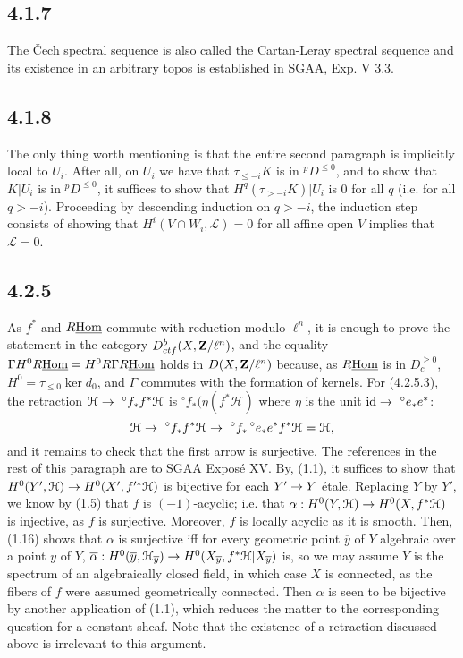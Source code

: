 \documentclass[deligne.tex]{subfiles}
\begin{document}
\subsection*{4.1.7}
The \v Cech spectral sequence is also called the Cartan-Leray spectral
sequence and its existence in an arbitrary topos is established in
SGAA, Exp. V 3.3.

\subsection*{4.1.8} The only thing worth mentioning is that the entire
second paragraph is implicitly local to $U_i$. After all, on $U_i$ we have 
that $\tau_{\leq-i}K$ is in $^pD^{\leq0}$, and to show that $K|{U_i}$ is in
$^pD^{\leq0}$, it suffices to show that $H^q(\tau_{>-i}K)|{U_i}$ is 0 for 
all $q$ (i.e. for all $q>-i$). Proceeding by descending induction on $q>-i$,
the induction step consists of showing that $H^i(V\cap W_i,\mathcal L)=0$
for all affine open $V$ implies that $\mathcal L=0$.

\subsection*{4.2.5}
As $f^*$ and $R\underline{\operatorname{Hom}}$ commute with reduction modulo $\ell^n$, it is
enough to prove the statement in the category $D^b_{ctf}(X,\mathbf{Z}/\ell^n)$,
and the equality $\Gamma H^0R\underline{\operatorname{Hom}}=H^0R\Gamma R\underline{\operatorname{Hom}}$
holds in $D(X,\mathbf{Z}/\ell^n)$ because, as $R\underline{\operatorname{Hom}}$ is in
$D_c^{\geq0}$, $H^0=\tau_{\leq0}\ker d_0$, and $\Gamma$ commutes with the
formation of kernels. For (4.2.5.3), the retraction
$\mathcal H\rightarrow\ ^\circ f_*f^*\mathcal H$ is $^\circ f_*(\eta(f^*\mathcal H)$
where $\eta$ is the unit $\operatorname{id}\rightarrow\ ^\circ e_*e^*$:
\begin{equation*}
	\mathcal H\rightarrow\ ^\circ f_*f^*\mathcal H
	\rightarrow\ ^\circ f_*\,^\circ e_* e^*f^*\mathcal H=\mathcal H,
\end{equation*}
and it remains to check that the first arrow is surjective.
The references in the rest of this paragraph are to SGAA Exposé XV.
By, (1.1), it suffices to show that
$H^0(Y',\mathcal H)\rightarrow H^0(X',f'^*\mathcal H)$ is bijective for each
$Y'\rightarrow Y$ étale. Replacing $Y$ by $Y'$, we know by (1.5) that $f$ is
$(-1)$-acyclic; i.e. that
$\alpha:H^0(Y,\mathcal H)\rightarrow H^0(X,f^*\mathcal H)$ is injective, as $f$ is
surjective. Moreover, $f$ is locally acyclic as it is smooth.
Then, (1.16) shows that $\alpha$ is surjective iff for every geometric
point $\overline y$ of $Y$ algebraic over a point $y$ of $Y$,
$\overline\alpha:H^0(\overline y,\mathcal H_{\overline y})\rightarrow H^0(X_{\overline y},f^*\mathcal H|X_{\overline y})$ is, so we may assume
$Y$ is the spectrum of an algebraically closed field, in which case $X$ is
connected, as the fibers of $f$ were assumed geometrically connected.
Then $\alpha$ is seen to be bijective by another application of (1.1),
which reduces the matter to the corresponding question for a constant sheaf.
Note that the existence of a retraction discussed above is irrelevant to
this argument.
\end{document}
